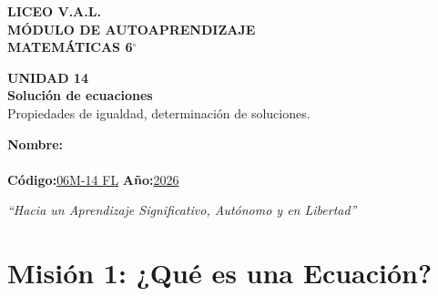 \documentclass[12pt, letterpaper]{article}
\begin{document}
	
	\begin{center}
		{\Huge\textbf{LICEO V.A.L.}}\\[0.5cm]
		{\LARGE\textbf{MÓDULO DE AUTOAPRENDIZAJE}}\\[0.5cm]
		{\Large\textbf{MATEMÁTICAS 6$^\circ$}}\\[0.5cm]
		\begin{tcolorbox}[colback=valblue!10, colframe=valblue,
			arc=3mm, boxrule=1.5pt]
			\centering
			\Huge\textbf{UNIDAD 14}\\[0.2cm]
			\Large\textbf{Solución de ecuaciones}\\[0.2cm]
			\large Propiedades de igualdad, determinación de soluciones.
		\end{tcolorbox}
		\vspace{0.6cm}
		\begin{tcolorbox}[colback=white, colframe=valblue,
			width=12cm, arc=3mm, boxrule=1.5pt]
			\centering\vspace{0.3cm}
			\textbf{Nombre:}\\[0.3cm]
			\underline{\hspace{9cm}}\\[0.5cm]
			\textbf{Código:}\;\underline{06M-14 FL}
			\hspace{1cm}\textbf{Año:}\;\underline{2026}
			\vspace{0.3cm}
		\end{tcolorbox}
		\vspace{0.8cm}
		\textit{``Hacia un Aprendizaje Significativo, Autónomo y en Libertad''}
	\end{center}
	
	
	\section*{Misión 1: ¿Qué es una Ecuación?}
	
\end{document}
